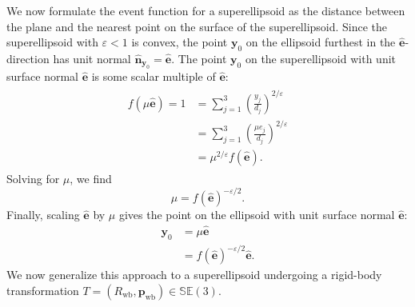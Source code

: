 \documentclass[]{article}
\newcommand{\colvec}[1]{\mathbf{#1}}
\theoremstyle{definition}
\theoremstyle{remark}
\begin{document}
We now formulate the event function for a superellipsoid as the distance between the plane and the nearest point on the surface of the superellipsoid.
Since the superellipsoid with $\varepsilon < 1$ is convex, the point $\colvec{y}_0$ on the ellipsoid furthest in the $\hat{\colvec{e}}$-direction has unit normal $\hat{\colvec{n}}_{\colvec{y}_0} = \hat{\colvec{e}}$.
The point $\colvec{y}_0$ on the superellipsoid with unit surface normal $\hat{\colvec{e}}$ is some scalar multiple of $\hat{\colvec{e}}$:
\begin{align}
	\begin{split}
	f(\mu\hat{\colvec{e}}) = 1 &= \sum_{j=1}^{3} \left(\frac{y_j}{d_j}\right)^{2/\varepsilon}\\
	&= \sum_{j=1}^{3} \left(\frac{\mu e_j}{d_j}\right)^{2/\varepsilon}\\
	&= \mu^{2/\varepsilon}f\left(\hat{\colvec{e}}\right).
	\end{split}
\end{align}
Solving for $\mu$, we find
\begin{equation}
	\mu = f\left(\hat{\colvec{e}}\right)^{-\varepsilon/2}.
\end{equation}
Finally, scaling $\hat{\colvec{e}}$ by $\mu$ gives the point on the ellipsoid with unit surface normal $\hat{\colvec{e}}$:
\begin{align}\label{eq:point_on_untransformed_superellipsoid_with_given_unit_normal}
	\colvec{y}_0 &= \mu\hat{\colvec{e}}\\
	&= f\left(\hat{\colvec{e}}\right)^{-\varepsilon/2}\hat{\colvec{e}}.
\end{align}
We now generalize this approach to a superellipsoid undergoing a rigid-body transformation $T = \left(R_\mathrm{wb},\colvec{p}_\mathrm{wb}\right)\in\mathbb{SE}(3)$.
\end{document}
